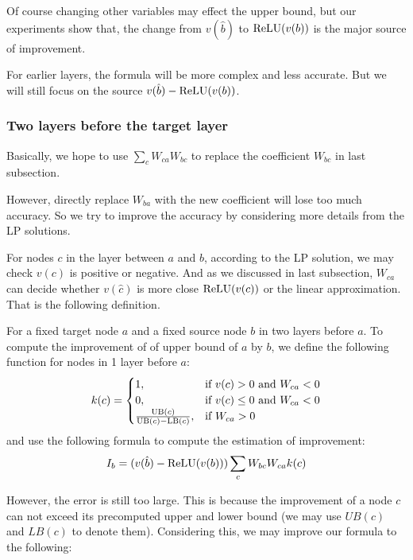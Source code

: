 Of course changing other variables may effect the upper bound, but our experiments show that, the change from $v(\hat{b})$ to $\mathrm{ReLU}(v(b))$ is the major source of improvement.

For earlier layers, the formula will be more complex and less accurate. But we will still focus on the source $v(\hat{b})-\mathrm{ReLU}(v(b))$.


\subsubsection*{Two layers before the target layer}

Basically, we hope to use $\sum_c W_{ca}W_{bc}$ to replace the coefficient $W_{bc}$ in last subsection. 

However, directly replace $W_{ba}$ with the new coefficient will lose too much accuracy. So we try to improve the accuracy by considering more details from the LP solutions.

For nodes $c$ in the layer between $a$ and $b$, according to the LP solution, we may check $v(c)$ is positive or negative. And as we discussed in last subsection, $W_{ca}$ can decide whether $v(\hat{c})$ is more close $\mathrm{ReLU}(v(c))$ or the linear approximation. That is the following definition. 

\begin{definition}
	For a fixed target node $a$ and a fixed source node $b$ in two layers before $a$. To compute the improvement of of upper bound of $a$ by $b$, we define the following function for nodes in 1 layer before $a$:
	\begin{align*}
		k(c) =
		\begin{cases}
			1, & \text{if } v(c) > 0 \text{ and } W_{ca} < 0\\
			0, & \text{if } v(c) \leq 0 \text{ and } W_{ca} < 0\\
			\frac{\mathrm{UB}(c)}{\mathrm{UB}(c)-\mathrm{LB}(c)}, & \text{if }W_{ca} > 0
		\end{cases}
	\end{align*} and use the following formula to compute the estimation of improvement: \begin{align*}
	I_b = (v(\hat{b})-\mathrm{ReLU}(v(b)))\sum_c W_{bc}W_{ca}k(c)
	\end{align*}
	
\end{definition} 

However, the error is still too large. This is because the improvement of a node $c$ can not exceed its precomputed upper and lower bound (we may use $UB(c)$ and $LB(c)$ to denote them). Considering this, we may improve our formula to the following:

